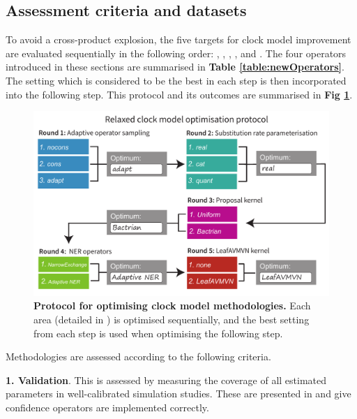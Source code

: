 \documentclass[10pt,letterpaper]{article}
\begin{document}
\subsection*{Assessment criteria and datasets}








To avoid a cross-product explosion, the five targets for clock model improvement are evaluated sequentially in the following order: \textbf{}, \textbf{}, \textbf{}, \textbf{}, and \textbf{}.
The four operators introduced in these sections are summarised in \textbf{Table \ref{table:newOperators}}.
The setting which is considered to be the best in each step is then incorporated into the following step. This protocol and its outcomes are summarised in \textbf{Fig \ref{fig:tournament}}.





\begin{figure}[!h]
\includegraphics[width=\textwidth]{Figures/tournament.pdf}
\caption{\textbf{Protocol for optimising clock model methodologies.} Each area (detailed in \textbf{}) is optimised sequentially, and the best setting from each step is used when optimising the following step.}
\label{fig:tournament}
\end{figure}


Methodologies are assessed according to the following criteria.


\textbf{1. Validation}. This is assessed by measuring the coverage of all estimated parameters in well-calibrated simulation studies. These are presented in \textbf{} and give confidence operators are implemented correctly. \\
\end{document}
